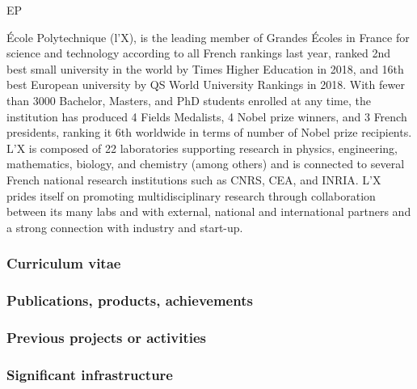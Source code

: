 \begin{sitedescription}{EP}

\'Ecole Polytechnique (l'X), is the leading member of Grandes \'Ecoles in France
for science and technology according to all French rankings last year, ranked
2nd best small university in the world by Times Higher Education in 2018, and
16th best European university by QS World University Rankings in 2018. With
fewer than 3000 Bachelor, Masters, and PhD students enrolled at any time, the
institution has produced 4 Fields Medalists, 4 Nobel prize winners, and 3 French
presidents, ranking it 6th worldwide in terms of number of Nobel prize
recipients. L'X is composed of 22 laboratories supporting research in physics,
engineering, mathematics, biology, and chemistry (among others) and is connected
to several French national research institutions such as CNRS, CEA, and INRIA.
L'X prides itself on promoting multidisciplinary research through collaboration
between its many labs and with external, national and international partners and
a strong connection with industry and start-up.

\subsubsection*{Curriculum vitae}








\subsubsection*{Publications, products, achievements}

\begin{compactenum}
\item {}
\end{compactenum}

\subsubsection*{Previous projects or activities}

\begin{compactenum}
\item {}
\end{compactenum}

\subsubsection*{Significant infrastructure}

\end{sitedescription}
